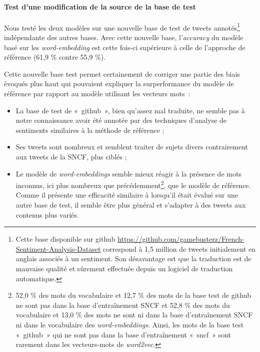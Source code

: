 \documentclass[11pt,french,french]{article}
\let\rmarkdownfootnote\footnote%
\def\footnote{\protect\rmarkdownfootnote}
\begin{document}
\hypertarget{test-dune-modification-de-la-source-de-la-base-de-test}{%
\paragraph{Test d'une modification de la source de la base de test}\label{test-dune-modification-de-la-source-de-la-base-de-test}}

Nous testé les deux modèles sur une nouvelle base de test de tweets annotés\footnote{Cette base disponible sur github \url{https://github.com/gamebusterz/French-Sentiment-Analysis-Dataset} correspond à 1,5 million de tweets initialement en anglais associés à un sentiment.
  Son désavantage est que la traduction est de mauvaise qualité et sûrement effectuée depuis un logiciel de traduction automatique.} indépendante des autres bases.
Avec cette nouvelle base, l'\emph{accuracy} du modèle basé sur les \emph{word-embedding} est cette fois-ci supérieure à celle de l'approche de référence (61,9 \% contre 55,9 \%).

Cette nouvelle base test permet certainement de corriger une partie des biais évoqués plus haut qui pouvaient expliquer la surperformance du modèle de référence par rapport au modèle utilisant les vecteurs mots~:

\begin{itemize}
\item
  La base de test de «~github~», bien qu'assez mal traduite, ne semble pas à notre connaissance avoir été annotée par des techniques d'analyse de sentiments similaires à la méthode de référence ;
\item
  Ses tweets sont nombreux et semblent traiter de sujets divers contrairement aux tweets de la SNCF, plus ciblés ;
\item
  Le modèle de \emph{word-embeddings} semble mieux réagir à la présence de mots inconnus, ici plus nombreux que précédemment\footnote{52,0 \% des mots du vocabulaire et 12,7 \% des mots de la base test de github ne sont pas dans la base d'entraînement SNCF et 52,8 \% des mots du vocabulaire et 13,0 \% des mots ne sont ni dans la base d'entraînement SNCF ni dans le vocabulaire des \emph{word-embeddings}.
    Ainsi, les mots de la base test «~github~» qui ne sont pas dans la base d'entraînement «~sncf~» sont rarement dans les vecteurs-mots de \emph{word2vec}.}, que le modèle de référence.
  Comme il présente une efficacité similaire à lorsqu'il était évalué sur une autre base de test, il semble être plus général et s'adapter à des tweets aux contenus plus variés.
\end{itemize}
\end{document}
